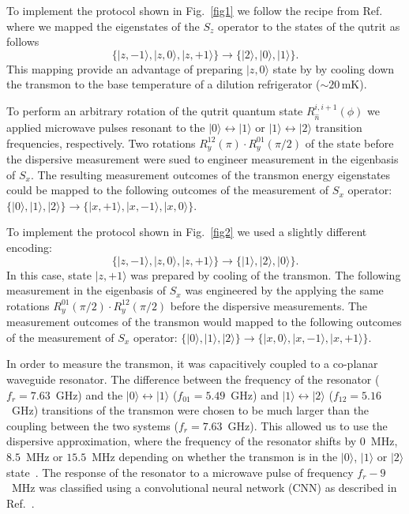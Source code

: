 \documentclass[11pt,a4paper]{article}
\begin{document}
To implement the protocol shown in Fig.~\ref{fig1} we follow the recipe from Ref.~\cite{PhysRevLett.119.240501} where we mapped the eigenstates of the $S_z$ operator to the states of the qutrit as follows
\begin{equation}
\{|z,-1\rangle,|z,0\rangle,|z,+1\rangle\} \rightarrow \{|2\rangle,|0\rangle,|1\rangle\}.
\end{equation}
This mapping provide an advantage of preparing $|z,0\rangle$ state by by cooling down the transmon to the base temperature of a dilution refrigerator ($\sim20\,$mK).

To perform an arbitrary rotation of the qutrit quantum state $R_{\hat n}^{i,i+1}(\phi)$ we applied microwave pulses resonant to the $|0\rangle  \leftrightarrow |1\rangle$ or $|1\rangle \leftrightarrow |2\rangle$ transition frequencies, respectively. Two rotations $R^{12}_y(\pi)\cdot R^{01}_y(\pi/2)$ of the state before the dispersive measurement were sued to engineer measurement in the eigenbasis of $S_x$. The resulting measurement outcomes of the transmon energy eigenstates could be mapped to the following outcomes of the measurement of $S_x$ operator: $\{|0\rangle,|1\rangle,|2\rangle\} \rightarrow \{|x,+1\rangle,|x,-1\rangle,|x,0\rangle\}$.

To implement the protocol shown in Fig.~\ref{fig2} we used a slightly different encoding:
\begin{equation}
\{|z,-1\rangle,|z,0\rangle,|z,+1\rangle\} \rightarrow \{|1\rangle,|2\rangle,|0\rangle\}.
\end{equation}
In this case, state $|z,+1\rangle$ was prepared by cooling of the transmon. The following measurement in the eigenbasis of $S_x$ was engineered by the applying the same rotations $R^{01}_y(\pi/2)\cdot R^{12}_y(\pi/2)$ before the dispersive measurements. The measurement outcomes of the transmon would mapped to the following outcomes of the measurement of $S_x$ operator: $\{|0\rangle,|1\rangle,|2\rangle\} \rightarrow \{|x,0\rangle,|x,-1\rangle,|x,+1\rangle\}$.

In order to measure the transmon, it was capacitively coupled to a co-planar waveguide resonator. The difference between the frequency of the resonator ($f_r = 7.63$~GHz) and the $|0\rangle\leftrightarrow|1\rangle$ ($f_{01} = 5.49$~GHz) and $|1\rangle\leftrightarrow|2\rangle$ ($f_{12} = 5.16$~GHz) transitions of the transmon were chosen to be much larger than the coupling between the two systems ($f_r = 7.63$~GHz). This allowed us to use the dispersive approximation, where the frequency of the resonator shifts by $0$~MHz, $8.5$~MHz or $15.5$~MHz depending on whether the transmon is in the $|0\rangle$, $|1\rangle$ or $|2\rangle$ state~\cite{Koch2007}. The response of the resonator to a microwave pulse of frequency $f_r - 9$~MHz was classified using a convolutional neural network (CNN) as described in Ref.~\cite{navarathnaNeuralNetworksOnthefly2021}.
\end{document}
